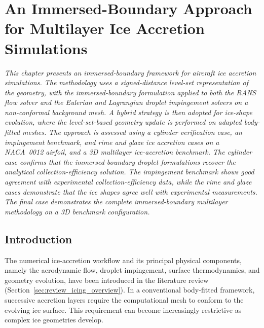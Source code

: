 \chapter{An Immersed-Boundary Approach for Multilayer Ice Accretion Simulations}\label{sec:ibmArticle}

\textit{
    This chapter presents an immersed-boundary framework for aircraft ice accretion simulations. The methodology uses a signed-distance level-set representation of the geometry, with the immersed-boundary formulation applied to both the RANS flow solver and the Eulerian and Lagrangian droplet impingement solvers on a non-conformal background mesh. A hybrid strategy is then adopted for ice-shape evolution, where the level-set-based geometry update is performed on adapted body-fitted meshes. The approach is assessed using a cylinder verification case, an impingement benchmark, and rime and glaze ice accretion cases on a NACA~0012 airfoil, and a 3D multilayer ice-accretion benchmark. The cylinder case confirms that the immersed-boundary droplet formulations recover the analytical collection-efficiency solution. The impingement benchmark shows good agreement with experimental collection-efficiency data, while the rime and glaze cases demonstrate that the ice shapes agree well with experimental measurements. The final case demonstrates the complete immersed-boundary multilayer methodology on a 3D benchmark configuration.
}

\section{Introduction}
\label{ibm:sec:introduction}

The numerical ice-accretion workflow and its principal physical components, namely the aerodynamic flow, droplet impingement, surface thermodynamics, and geometry evolution, have been introduced in the literature review (Section~\ref{sec:review_icing_overview}). In a conventional body-fitted framework, successive accretion layers require the computational mesh to conform to the evolving ice surface. This requirement can become increasingly restrictive as complex ice geometries develop.

